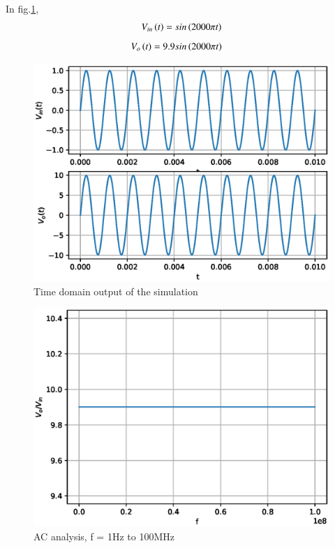 \begin{enumerate}[label=\thesubsection.\arabic*.,ref=\thesubsection.\theenumi]
In fig.\ref{fig:ee18btech11039_fig6}, 
\begin{align}
    V_{in}\left(t\right) = sin\left(2000\pi t\right)
\end{align}
\begin{align}
    V_{o}\left(t\right) = 9.9&sin\left(2000\pi t\right)
\end{align}
\begin{figure}[!h]
		\includegraphics[width=\columnwidth]{./figs/ee18btech11039/spice_1.eps}
\caption{Time domain output of the simulation}
\label{fig:ee18btech11039_fig6}
\end{figure}

\begin{figure}[!h]
		\includegraphics[width=\columnwidth]{./figs/ee18btech11039/spice_2.eps}
\caption{AC analysis, f = 1Hz to 100MHz}
\label{fig:ee18btech11039_fig7}
\end{figure}

\end{enumerate}